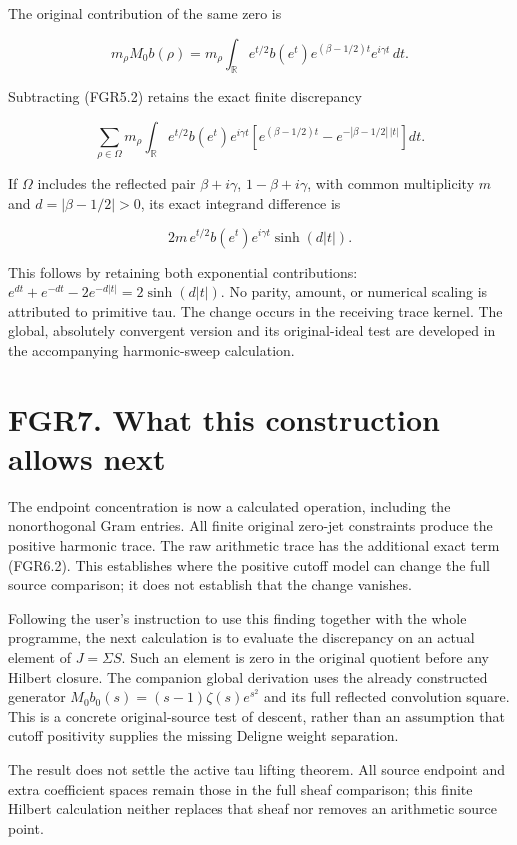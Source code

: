 The original contribution of the same zero is

\[
 m_\rho M_0b(\rho)
 =m_\rho\int_{\mathbb R}e^{t/2}b(e^t)
                  e^{(\beta-1/2)t}e^{i\gamma t}\,dt.
\tag{FGR6.1}
\]

Subtracting (FGR5.2) retains the exact finite discrepancy

\[
 \sum_{\rho\in\Omega}m_\rho\int_{\mathbb R}e^{t/2}b(e^t)e^{i\gamma t}
 \left[e^{(\beta-1/2)t}-e^{-|\beta-1/2|\,|t|}\right]dt.
\tag{FGR6.2}
\]

If \(\Omega\) includes the reflected pair \(\beta+i\gamma\),
\(1-\beta+i\gamma\), with common multiplicity \(m\) and
\(d=|\beta-1/2|>0\), its exact integrand difference is

\[
 2m\,e^{t/2}b(e^t)e^{i\gamma t}\sinh(d|t|).
\tag{FGR6.3}
\]

This follows by retaining both exponential contributions:
\(e^{dt}+e^{-dt}-2e^{-d|t|}=2\sinh(d|t|)\). No parity, amount, or
numerical scaling is attributed to primitive tau. The change occurs in
the receiving trace kernel. The global, absolutely convergent version
and its original-ideal test are developed in the accompanying
harmonic-sweep calculation.

\section{FGR7. What this construction allows
next}\label{fgr7.-what-this-construction-allows-next}

The endpoint concentration is now a calculated operation, including the
nonorthogonal Gram entries. All finite original zero-jet constraints
produce the positive harmonic trace. The raw arithmetic trace has the
additional exact term (FGR6.2). This establishes where the positive
cutoff model can change the full source comparison; it does not
establish that the change vanishes.

Following the user's instruction to use this finding together with the
whole programme, the next calculation is to evaluate the discrepancy on
an actual element of \(J=\Sigma S\). Such an element is zero in the
original quotient before any Hilbert closure. The companion global
derivation uses the already constructed generator
\(M_0b_0(s)=(s-1)\zeta(s)e^{s^2}\) and its full reflected convolution
square. This is a concrete original-source test of descent, rather than
an assumption that cutoff positivity supplies the missing Deligne weight
separation.

The result does not settle the active tau lifting theorem. All source
endpoint and extra coefficient spaces remain those in the full sheaf
comparison; this finite Hilbert calculation neither replaces that sheaf
nor removes an arithmetic source point.

